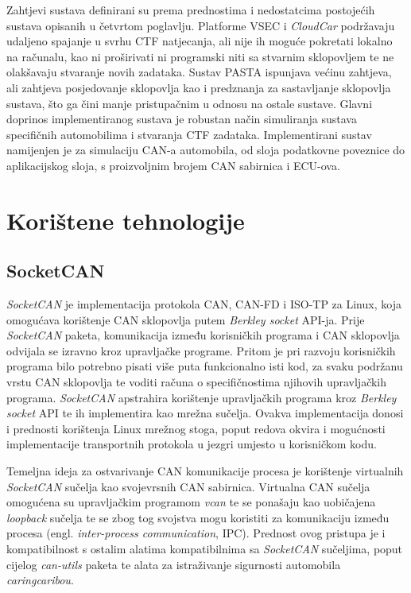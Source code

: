 \documentclass[times, utf8, diplomski, numeric]{fer}
\begin{document}
Zahtjevi sustava definirani su prema prednostima i nedostatcima postojećih sustava opisanih u četvrtom poglavlju. Platforme VSEC i \textit{CloudCar} podržavaju udaljeno spajanje u svrhu CTF natjecanja, ali nije ih moguće pokretati lokalno na računalu, kao ni proširivati ni programski niti sa stvarnim sklopovljem te ne olakšavaju stvaranje novih zadataka. Sustav PASTA ispunjava većinu zahtjeva, ali zahtjeva posjedovanje sklopovlja kao i predznanja za sastavljanje sklopovlja sustava, što ga čini manje pristupačnim u odnosu na ostale sustave. Glavni doprinos implementiranog sustava je robustan način simuliranja sustava specifičnih automobilima i stvaranja CTF zadataka. Implementirani sustav namijenjen je za simulaciju CAN-a automobila, od sloja podatkovne poveznice do aplikacijskog sloja, s proizvoljnim brojem CAN sabirnica i ECU-ova.
\section{Korištene tehnologije}
\subsection{SocketCAN}
\textit{SocketCAN} je implementacija protokola CAN, CAN-FD i ISO-TP za Linux, koja omogućava korištenje CAN sklopovlja putem \textit{Berkley socket} API-ja\cite{socketcan}. Prije \textit{SocketCAN} paketa, komunikacija između korisničkih programa i CAN sklopovlja odvijala se izravno kroz upravljačke programe. Pritom je pri razvoju korisničkih programa bilo potrebno pisati više puta funkcionalno isti kod, za svaku podržanu vrstu CAN sklopovlja te voditi računa o specifičnostima njihovih upravljačkih programa. \textit{SocketCAN} apstrahira korištenje upravljačkih programa kroz \textit{Berkley socket} API te ih implementira kao mrežna sučelja. Ovakva implementacija donosi i prednosti korištenja Linux mrežnog stoga, poput redova okvira  i mogućnosti implementacije transportnih protokola u jezgri umjesto u korisničkom  kodu.

Temeljna ideja za ostvarivanje CAN komunikacije procesa je korištenje virtualnih \textit{SocketCAN} sučelja kao svojevrsnih CAN sabirnica. Virtualna CAN sučelja omogućena su upravljačkim programom \textit{vcan} te se ponašaju kao uobičajena \textit{loopback} sučelja te se zbog tog svojstva mogu koristiti za komunikaciju između procesa (engl. \textit{inter-process communication}, IPC). Prednost ovog pristupa je i kompatibilnost s ostalim alatima kompatibilnima sa \textit{SocketCAN} sučeljima, poput cijelog \textit{can-utils} paketa te alata za istraživanje sigurnosti automobila \textit{caringcaribou}. 
\end{document}
